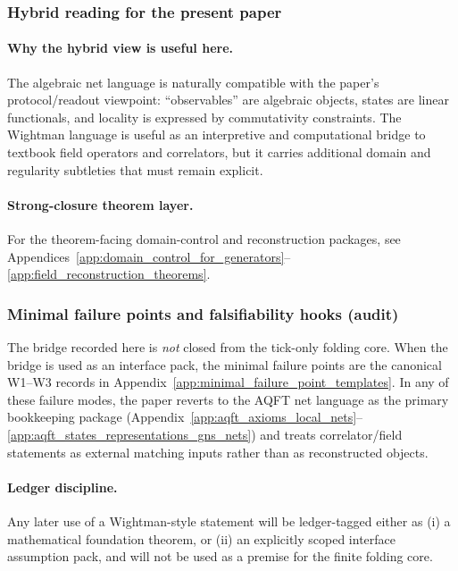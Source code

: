 \subsubsection{Hybrid reading for the present paper}
\paragraph{Why the hybrid view is useful here.}
\InterfaceTag The algebraic net language is naturally compatible with the paper's protocol/readout viewpoint: ``observables'' are algebraic objects, states are linear functionals, and locality is expressed by commutativity constraints.
The Wightman language is useful as an interpretive and computational bridge to textbook field operators and correlators, but it carries additional domain and regularity subtleties that must remain explicit.

\paragraph{Strong-closure theorem layer.}
\AuditTag For the theorem-facing domain-control and reconstruction packages, see Appendices~\ref{app:domain_control_for_generators}--\ref{app:field_reconstruction_theorems}.

\subsubsection{Minimal failure points and falsifiability hooks (audit)}
\label{subsec:wightman_bridge_minimal_failure_points}
\AuditTag The bridge recorded here is \emph{not} closed from the tick-only folding core.
When the bridge is used as an interface pack, the minimal failure points are the canonical W1--W3 records in Appendix~\ref{app:minimal_failure_point_templates}.
In any of these failure modes, the paper reverts to the AQFT net language as the primary bookkeeping package (Appendix~\ref{app:aqft_axioms_local_nets}--\ref{app:aqft_states_representations_gns_nets}) and treats correlator/field statements as external matching inputs rather than as reconstructed objects.

\paragraph{Ledger discipline.}
\AuditTag Any later use of a Wightman-style statement will be ledger-tagged either as (i) a mathematical foundation theorem, or (ii) an explicitly scoped interface assumption pack, and will not be used as a premise for the finite folding core.
